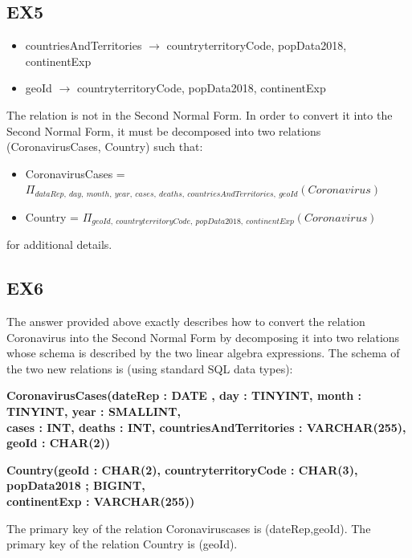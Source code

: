 \documentclass{article}
\begin{document}
\subsection{EX5}
\begin{itemize}
    \item countriesAndTerritories $\rightarrow$ countryterritoryCode, popData2018, continentExp
    \item geoId $\rightarrow$ countryterritoryCode, popData2018, continentExp
\end{itemize}
The relation is not in the Second Normal Form. In order to convert it into the Second Normal Form, it must be decomposed into two relations (CoronavirusCases, Country) such that:
\begin{itemize}
    \item CoronavirusCases = $\Pi_{dataRep, \:day, \:month, \:year, \:cases, \:deaths, \:countriesAndTerritories, \:geoId}(Coronavirus)$
    
    \item Country = $\Pi_{geoId,\: countryterritoryCode,\: popData2018,\: continentExp}(Coronavirus)$
    
\end{itemize}
\textcolor{blue}{} for additional details.

\subsection{EX6}
The answer provided above exactly describes how to convert the relation Coronavirus into the Second Normal Form by decomposing it into two relations whose schema is described by the two linear algebra expressions.
The schema of the two new relations is (using standard SQL data types):
\begin{center}
    \item \textbf{CoronavirusCases(dateRep : DATE , day : TINYINT, month : TINYINT, year : SMALLINT,\\cases : INT, deaths : INT, countriesAndTerritories : VARCHAR(255), geoId : CHAR(2))}
\end{center}
\begin{center}
        \item \textbf{Country(geoId : CHAR(2), countryterritoryCode : CHAR(3), popData2018 ; BIGINT,\\ continentExp : VARCHAR(255))}
\end{center}
The primary key of the relation Coronaviruscases is (dateRep,geoId). The primary key of the relation Country is (geoId).
\end{document}
